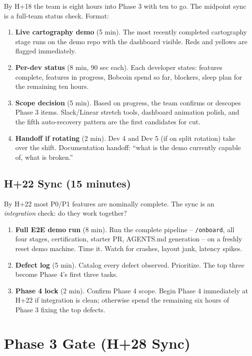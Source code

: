 \documentclass[11pt,letterpaper]{article}
\begin{document}
By H+18 the team is eight hours into Phase 3 with ten to go. The midpoint sync is a full-team status check. Format:

\begin{enumerate}
  \item \textbf{Live cartography demo} (5 min). The most recently completed cartography stage runs on the demo repo with the dashboard visible. Reds and yellows are flagged immediately.
  \item \textbf{Per-dev status} (8 min, 90 sec each). Each developer states: features complete, features in progress, Bobcoin spend so far, blockers, sleep plan for the remaining ten hours.
  \item \textbf{Scope decision} (5 min). Based on progress, the team confirms or descopes Phase 3 items. Slack/Linear stretch tools, dashboard animation polish, and the fifth auto-recovery pattern are the first candidates for cut.
  \item \textbf{Handoff if rotating} (2 min). Dev 4 and Dev 5 (if on split rotation) take over the shift. Documentation handoff: ``what is the demo currently capable of, what is broken.''
\end{enumerate}

\subsection{H+22 Sync (15 minutes)}

By H+22 most P0/P1 features are nominally complete. The sync is an \textit{integration} check: do they work together?

\begin{enumerate}
  \item \textbf{Full E2E demo run} (8 min). Run the complete pipeline -- \texttt{/onboard}, all four stages, certification, starter PR, AGENTS.md generation -- on a freshly reset demo machine. Time it. Watch for crashes, layout jank, latency spikes.
  \item \textbf{Defect log} (5 min). Catalog every defect observed. Prioritize. The top three become Phase 4's first three tasks.
  \item \textbf{Phase 4 lock} (2 min). Confirm Phase 4 scope. Begin Phase 4 immediately at H+22 if integration is clean; otherwise spend the remaining six hours of Phase 3 fixing the top defects.
\end{enumerate}

\section{Phase 3 Gate (H+28 Sync)}
\end{document}
